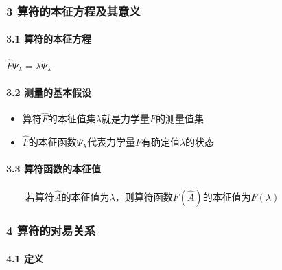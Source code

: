 \documentclass[UTF8,twocolumn]{ctexart}
\providecommand{\tightlist}{%
  \setlength{\itemsep}{0pt}\setlength{\parskip}{0pt}}
\let\oldparagraph\paragraph
\renewcommand{\paragraph}[1]{\oldparagraph{#1}\mbox{}}
\begin{document}
\hypertarget{ux7b97ux7b26ux7684ux672cux5f81ux65b9ux7a0bux53caux5176ux610fux4e49}{%
\subsubsection{3
算符的本征方程及其意义}\label{ux7b97ux7b26ux7684ux672cux5f81ux65b9ux7a0bux53caux5176ux610fux4e49}}

\hypertarget{ux7b97ux7b26ux7684ux672cux5f81ux65b9ux7a0b}{%
\paragraph{ 3.1
算符的本征方程}\label{ux7b97ux7b26ux7684ux672cux5f81ux65b9ux7a0b}}

\begin{center}
$\hat{F}\Psi_{\lambda}=\lambda\Psi_{\lambda}$
\end{center}

\hypertarget{ux6d4bux91cfux7684ux57faux672cux5047ux8bbe}{%
\paragraph{ 3.2
测量的基本假设}\label{ux6d4bux91cfux7684ux57faux672cux5047ux8bbe}}

\begin{itemize}
\tightlist
\item
  算符\(\hat{F}\)的本征值集\({\lambda}\)就是力学量\(F\)的测量值集
\item
  \(\hat{F}\)的本征函数\(\Psi_{\lambda}\)代表力学量\(F\)有确定值\(\lambda\)的状态
\end{itemize}

\hypertarget{ux7b97ux7b26ux51fdux6570ux7684ux672cux5f81ux503c}{%
\paragraph{ 3.3
算符函数的本征值}\label{ux7b97ux7b26ux51fdux6570ux7684ux672cux5f81ux503c}}

  若算符\(\hat{A}\)的本征值为\(\lambda\)，则算符函数\(F(\hat{A})\)的本征值为\(F(\lambda)\)

\hypertarget{ux7b97ux7b26ux7684ux5bf9ux6613ux5173ux7cfb}{%
\subsubsection{4
算符的对易关系}\label{ux7b97ux7b26ux7684ux5bf9ux6613ux5173ux7cfb}}

\hypertarget{ux5b9aux4e49}{%
\paragraph{ 4.1 定义}\label{ux5b9aux4e49}}
\end{document}
